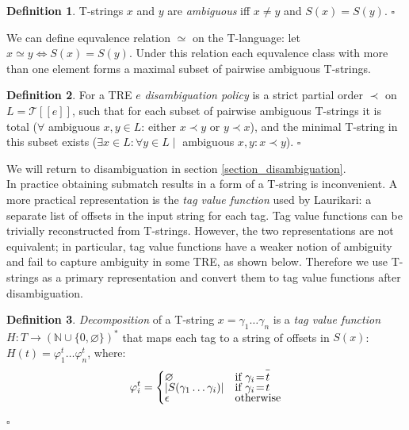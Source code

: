 \documentclass{article}
\newcommand{\Xin}{\!\in\!}
\newcommand{\Xeq}{\!=\!}
\newcommand{\Xlb}{[\![}
\newcommand{\Xrb}{]\!]}
\newcommand{\XT}{\mathcal{T}}
\newcommand{\YN}{\mathbb{N}}
\newcommand*{\Xbar}[1]{\overline{#1\vphantom{\bar{#1}}}}
\theoremstyle{definition}
\newtheorem{Xdef}{Definition}
\begin{document}
\begin{multicols}{2}
    \begin{Xdef}
    T-strings $x$ and $y$ are \emph{ambiguous} iff $x \!\neq\! y$ and $S(x) \Xeq S(y)$.
    $\square$
    \end{Xdef}

We can define equvalence relation $\simeq$ on the T-language: let $x \simeq y \Leftrightarrow S(x) \Xeq S(y)$.
Under this relation each equvalence class with more than one element forms a maximal subset of pairwise ambiguous T-strings.

    \begin{Xdef}
    For a TRE $e$ \emph{disambiguation policy} is a strict partial order $\prec$ on $L \Xeq \XT \Xlb e \Xrb$, such that
    for each subset of pairwise ambiguous T-strings
    it is total ($\forall$ ambiguous $x, y \Xin L$: either $x \prec y$ or $y \prec x$),
    and the minimal T-string in this subset exists ($\exists x \Xin L: \forall y \Xin L \mid$ ambiguous $x, y: x \prec y$).
    $\square$
    \end{Xdef}

We will return to disambiguation in section \ref{section_disambiguation}.
\\

In practice obtaining submatch results in a form of a T-string is inconvenient.
A more practical representation is the \emph{tag value function} used by Laurikari: 
a separate list of offsets in the input string for each tag.
Tag value functions can be trivially reconstructed from T-strings.
However, the two representations are not equivalent;
in particular, tag value functions have a weaker notion of ambiguity and fail to capture ambiguity in some TRE, as shown below.
Therefore we use T-strings as a primary representation
and convert them to tag value functions after disambiguation.

    \begin{Xdef}\label{tagvalfun}
    \emph{Decomposition} of a T-string $x \Xeq \gamma_1 \dots \gamma_n$
    is a \emph{tag value function} $H: T \rightarrow (\YN \cup \{ 0, \varnothing \})^*$
    that maps each tag to a string of offsets in $S(x)$:
    $H(t) \Xeq \varphi^t_1 \dots \varphi^t_n$, where:
    $$\varphi^t_i = \begin{cases}
            \varnothing &\text{if } \gamma_i \Xeq \Xbar{t} \\[-0.5em]
            |S(\gamma_1 \dots \gamma_i)| &\text{if } \gamma_i \Xeq t \\[-0.5em]
            \epsilon &\text{otherwise}
        \end{cases}$$
    $\square$
    \end{Xdef}


\end{multicols}
\end{document}
